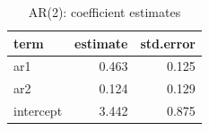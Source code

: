 \begin{table}

\caption{\label{tab:ar2-coef}AR(2): coefficient estimates}
\centering
\begin{tabular}[t]{lrr}
\toprule
term & estimate & std.error\\
\midrule
ar1 & 0.463 & 0.125\\
ar2 & 0.124 & 0.129\\
intercept & 3.442 & 0.875\\
\bottomrule
\end{tabular}
\end{table}
